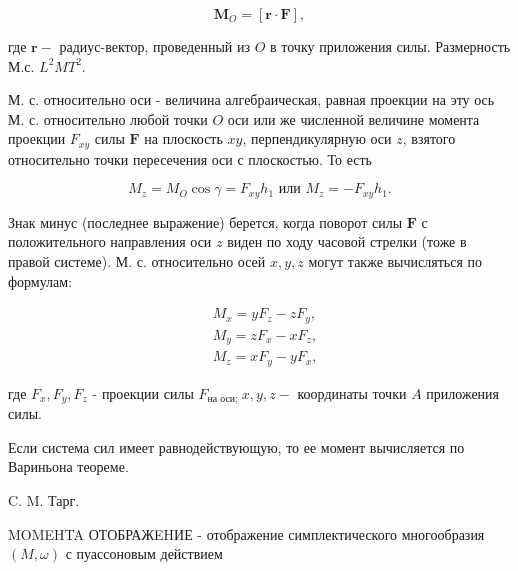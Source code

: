 \documentclass[10pt]{article}
\begin{document}
\[

\boldsymbol{M}_{O}=[\boldsymbol{r} \cdot \boldsymbol{F}],

\]



где $\boldsymbol{r}-$ радиус-вектор, проведенный из $O$ в точку приложения силы. Размерность М.с. $L^{2} M T^{2}$.



М. с. относительно оси - величина алгебраическая, равная проекции на эту ось М. с. относительно любой точки $O$ оси или же численной величине момента проекции $F_{x y}$ силы $\boldsymbol{F}$ на плоскость $x y$, перпендикулярную оси $z$, взятого относительно точки пересечения оси с плоскостью. То есть



\[

M_{z}=M_{O} \cos \gamma=F_{x y} h_{1} \text { или } M_{z}=-F_{x y} h_{1} .

\]



Знак минус (последнее выражение) берется, когда поворот силы $\boldsymbol{F}$ с положительного направления оси $z$ виден по ходу часовой стрелки (тоже в правой системе). М. с. относительно осей $x, y, z$ могут также вычисляться по формулам:



\[

\begin{aligned}

& M_{x}=y F_{z}-z F_{y}, \\

& M_{y}=z F_{x}-x F_{z}, \\

& M_{z}=x F_{y}-y F_{x},

\end{aligned}

\]



где $F_{x}, F_{y}, F_{z}$ - проекции силы $F_{\text {на оси; }} x, y, z-$ координаты точки $A$ приложения силы.



Если система сил имеет равнодействующую, то ее момент вычисляется по Вариньона теореме.



C. M. Тарг.



MOMEHTA ОТОБРАЖEHИЕ - отображение симплектического многообразия $(M, \omega)$ с пуассоновым действием
\end{document}
